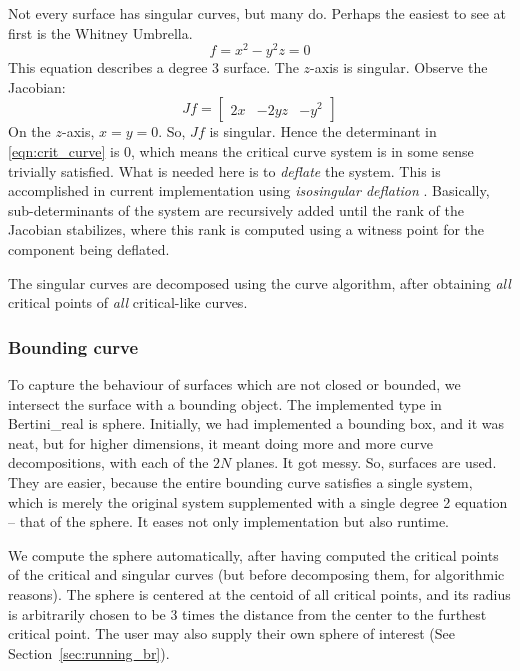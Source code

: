 Not every surface has singular curves, but many do.  Perhaps the easiest to see at first is the Whitney Umbrella.
\begin{equation}
f = x^2 - y^2 z = 0
\end{equation}
This equation describes a degree 3 surface.  The $z$-axis is singular.  Observe the Jacobian:
\begin{equation}
Jf = \begin{bmatrix}
2x & -2yz & -y^2
\end{bmatrix}
\end{equation}
On the $z$-axis, $x = y = 0$.  So, $Jf$ is singular.  Hence the determinant in \eqref{eqn:crit_curve} is $0$, which means the critical curve system is in some sense trivially satisfied.  What is needed here is to {\em deflate} the system.  This is accomplished in current implementation using {\em isosingular deflation} \cite{hauenstein2013isosingular}.  Basically, sub-determinants of the system are recursively added until the rank of the Jacobian stabilizes, where this rank is computed using a witness point for the component being deflated.

The singular curves are decomposed using the curve algorithm, after obtaining {\em all} critical points of {\em all} critical-like curves.

\subsubsection{Bounding curve}

To capture the behaviour of surfaces which are not closed or bounded, we intersect the surface with a bounding object.  The implemented type in Bertini\_real is sphere.  Initially, we had implemented a bounding box, and it was neat, but for higher dimensions, it meant doing more and more curve decompositions, with each of the $2N$ planes.  It got messy.  So, surfaces are used.  They are easier, because the entire bounding curve satisfies a single system, which is merely the original system supplemented with a single degree 2 equation -- that of the sphere.  It eases not only implementation but also runtime.

We compute the sphere automatically, after having computed the critical points of the critical and singular curves (but before decomposing them, for algorithmic reasons).  The sphere is centered at the centoid of all critical points, and its radius is arbitrarily chosen to be 3 times the distance from the center to the furthest critical point.  The user may also supply their own sphere of interest (See Section~\ref{sec:running_br}).




